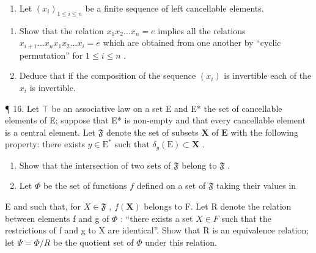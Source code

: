 \begin{enumerate}
\def\labelenumi{\arabic{enumi}.}
\setcounter{enumi}{14}
\tightlist
\item
  Let \((x_{i})_{1\leqslant i\leqslant n}\) be a finite sequence of left cancellable elements.
\end{enumerate}

\begin{enumerate}
\def\labelenumi{(\alph{enumi})}
\item
  Show that the relation \(x_{1}x_{2}\ldots x_{n} = e\) implies all the relations \(x_{i + 1}\ldots x_nx_1x_2\ldots x_i = e\) which are obtained from one another by ``cyclic permutation'' for \(1\leqslant i\leqslant n\) .
\item
  Deduce that if the composition of the sequence \((x_{i})\) is invertible each of the \(x_{i}\) is invertible.
\end{enumerate}

¶ 16. Let \(\top\) be an associative law on a set E and E* the set of cancellable elements of E; suppose that E* is non-empty and that every cancellable element is a central element. Let \(\mathfrak{F}\) denote the set of subsets \(\mathbf{X}\) of \(\mathbf{E}\) with the following property: there exists \(y \in \mathrm{E}^*\) such that \(\delta_y(\mathrm{E}) \subset \mathbf{X}\) .

\begin{enumerate}
\def\labelenumi{(\alph{enumi})}
\item
  Show that the intersection of two sets of \(\mathfrak{F}\) belong to \(\mathfrak{F}\) .
\item
  Let \(\Phi\) be the set of functions \(f\) defined on a set of \(\mathfrak{F}\) taking their values in
\end{enumerate}

E and such that, for \(X \in \mathfrak{F}\) , \(f(\mathbf{X})\) belongs to F. Let R denote the relation between elements f and g of \(\Phi\) : ``there exists a set \(X \in F\) such that the restrictions of f and g to X are identical''. Show that R is an equivalence relation; let \(\Psi = \Phi/R\) be the quotient set of \(\Phi\) under this relation.

